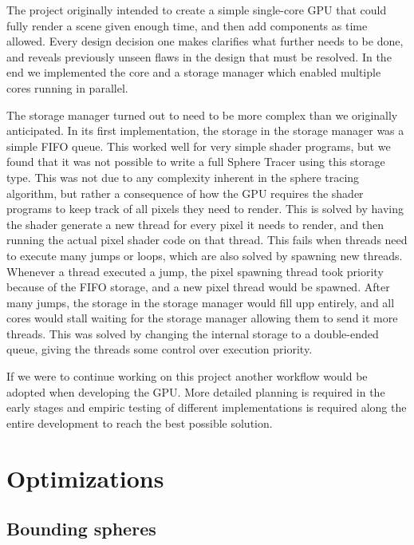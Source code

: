			The project originally intended to create a simple single-core GPU
			that could fully render a scene given enough time, and then add	
			components as time allowed. Every design decision one makes 
			clarifies what further needs to be done, and reveals previously 
			unseen flaws in the design that must
			be resolved. In the end we implemented the core and a storage 
			manager which enabled multiple cores running in parallel.

			The storage manager turned out to need to be more complex than we 
			originally anticipated. In its first implementation, the storage in
			the storage manager was a simple FIFO queue. This worked well for 
			very simple shader programs, but we found that it was not possible
			to write a full Sphere Tracer using this storage type. This was not
			due to any complexity inherent in the sphere tracing algorithm, but
			rather a consequence of how the GPU requires the shader programs to
			keep track of all pixels they need to render. This is solved by 
			having the shader generate a new thread for every pixel it needs to
			render, and then running the actual pixel shader code on that 
			thread. This fails when threads need to execute many jumps or 
			loops, which are also solved by spawning new threads. Whenever a 
			thread executed a jump, the pixel spawning thread took priority 
			because of the FIFO storage, and a new pixel thread would be 
			spawned. After many jumps, the storage in the storage manager would 
			fill upp entirely, and all cores would stall waiting for the 
			storage manager allowing them to send it more threads. This was 
			solved by changing the internal storage to a double-ended queue,
			giving the threads some control over execution priority.

			If we were to continue working on this project another workflow
			would be adopted when developing the GPU. More detailed planning is
			required in the early stages and empiric testing of different
			implementations is required along the entire development to reach
			the best possible solution.

	\section{Optimizations} \label{optimization}

		\subsection{Bounding spheres}

